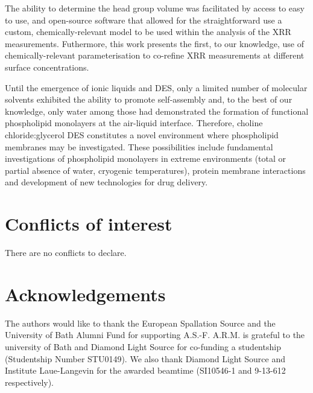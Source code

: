 \documentclass[twoside,twocolumn,9pt]{article}
\renewcommand{\refname}{Notes and references}
\begin{document}
The ability to determine the head group volume was facilitated by access to easy to use, and open-source software that allowed for the straightforward use a custom, chemically-relevant model to be used within the analysis of the XRR measurements. Futhermore, this work presents the first, to our knowledge, use of chemically-relevant parameterisation to co-refine XRR measurements at different surface concentrations. 

Until the emergence of ionic liquids and DES, only a limited number of molecular solvents exhibited the ability to promote self-assembly and, to the best of our knowledge, only water among those had demonstrated the formation of functional phospholipid monolayers at the air-liquid interface. Therefore, choline chloride:glycerol DES constitutes a novel environment where phospholipid membranes may be investigated. These possibilities include fundamental investigations of phospholipid monolayers in extreme environments (total or partial absence of water, cryogenic temperatures), protein membrane interactions and development of new technologies for drug delivery.

\section*{Conflicts of interest}
There are no conflicts to declare.

\section*{Acknowledgements}
The authors would like to thank the European Spallation Source and the University of Bath Alumni Fund for supporting A.S.-F. A.R.M. is grateful to the university of Bath and Diamond Light Source for co-funding a studentship (Studentship Number STU0149). We also thank Diamond Light Source and Institute Laue-Langevin for the awarded beamtime (SI10546-1 and 9-13-612 respectively).



\balance


\end{document}
